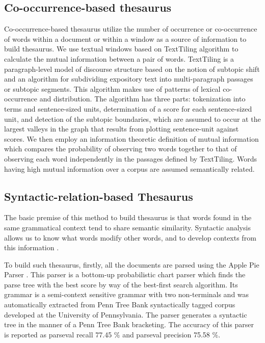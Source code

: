\subsection{Co-occurrence-based thesaurus}
Co-occurrence-based thesaurus utilize the number  of occurrence or co-occurrence of words within a document or within a window as a source of information to build thesaurus. We use textual windows based on TextTiling algorithm \cite{hearst94,hearst97}  to calculate the mutual information between a pair of words. TextTiling is a paragraph-level model of discourse structure based on the notion of subtopic shift and an algorithm for subdividing expository text into multi-paragraph passages or subtopic segments. This algorithm makes use of patterns of lexical co-occurrence and distribution. The algorithm has three parts: tokenization into terms and sentence-sized units, determination of a score for each sentence-sized unit, and detection of the subtopic boundaries, which are assumed to occur at the largest valleys in the graph that results from plotting sentence-unit against scores. We  then employ an information theoretic definition of mutual information which compares the probability of observing two words together to that of observing each word independently in the passages defined by TextTiling. Words having high mutual information over a corpus are assumed semantically related. 


\subsection{Syntactic-relation-based Thesaurus}
The basic premise of this method to build thesaurus is that words found in the same grammatical context tend to share semantic similarity. Syntactic analysis allows us to know what words modify other words, and to develop contexts from this information  \cite{grefenstette94,ruge92,hindle90}.

To build such thesaurus, firstly,  all the documents are parsed using the Apple Pie Parser \cite{sekine95}. This parser is a bottom-up probabilistic chart parser which finds the parse tree with the best score by way of the best-first search algorithm. Its grammar is a semi-context sensitive grammar with two non-terminals and  was automatically extracted from Penn Tree Bank syntactically tagged corpus developed at the University of Pennsylvania. 
The parser generates a syntactic tree in the manner of a  Penn Tree Bank
bracketing. 
The accuracy of this parser is reported as parseval recall 77.45 \% and parseval precision 
75.58 \%. 

